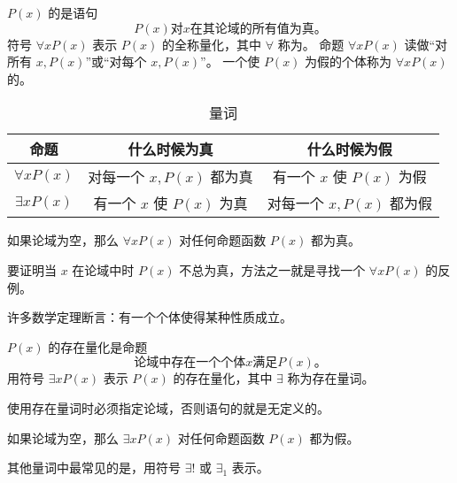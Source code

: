 {{{            \begin{defines}
                $P(x)$ 的是语句
                $$P(x)\text{对}x\text{在其论域的所有值为真。}$$
                符号 $\forall xP(x)$ 表示 $P(x)$ 的全称量化，其中 $\forall$ 称为。
                命题 $\forall xP(x)$ 读做``对所有 $x, P(x)$''或``对每个 $x, P(x)$''。
                一个使 $P(x)$ 为假的个体称为 $\forall xP(x)$ 的。
            \end{defines}

            \begin{table}[htb]
                \centering

                \begin{tabular}{c|c|c}
                    \hline
                    命题 & 什么时候为真 & 什么时候为假 \\
                    \hline
                    $\forall xP(x)$ & 对每一个 $x, P(x)$ 都为真 & 有一个 $x$ 使 $P(x)$ 为假 \\
                    $\exists xP(x)$ & 有一个 $x$ 使 $P(x)$ 为真 & 对每一个 $x, P(x)$ 都为假 \\
                    \hline
                \end{tabular}

                \caption{量词}
            \end{table}

            如果论域为空，那么 $\forall xP(x)$ 对任何命题函数 $P(x)$ 都为真。

            要证明当 $x$ 在论域中时 $P(x)$ 不总为真，方法之一就是寻找一个 $\forall xP(x)$ 的反例。
        }

        {
            许多数学定理断言：有一个个体使得某种性质成立。

            \begin{defines}
                $P(x)$ 的存在量化是命题
                $$\text{论域中存在一个个体}x\text{满足}P(x)\text{。}$$
                用符号 $\exists xP(x)$ 表示 $P(x)$ 的存在量化，其中 $\exists$ 称为存在量词。
            \end{defines}

            使用存在量词时必须指定论域，否则语句的就是无定义的。

            如果论域为空，那么 $\exists xP(x)$ 对任何命题函数 $P(x)$ 都为假。
        }

        {
            其他量词中最常见的是，用符号 $\exists !$ 或 $\exists_1$ 表示。
        }
    }

}
